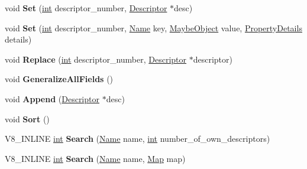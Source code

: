 \begin{DoxyCompactItemize}
void {\bfseries Set} (\mbox{\hyperlink{classint}{int}} descriptor\+\_\+number, \mbox{\hyperlink{classv8_1_1internal_1_1Descriptor}{Descriptor}} $\ast$desc)
\item 
\mbox{\label{classv8_1_1internal_1_1DescriptorArray_a01c9b4a85ea0c8445676617dde9ecb64}} 
void {\bfseries Set} (\mbox{\hyperlink{classint}{int}} descriptor\+\_\+number, \mbox{\hyperlink{classv8_1_1internal_1_1Name}{Name}} key, \mbox{\hyperlink{classv8_1_1internal_1_1MaybeObject}{Maybe\+Object}} value, \mbox{\hyperlink{classv8_1_1internal_1_1PropertyDetails}{Property\+Details}} details)
\item 
\mbox{\label{classv8_1_1internal_1_1DescriptorArray_a077c7152dd11617df87f9b272b70a97c}} 
void {\bfseries Replace} (\mbox{\hyperlink{classint}{int}} descriptor\+\_\+number, \mbox{\hyperlink{classv8_1_1internal_1_1Descriptor}{Descriptor}} $\ast$descriptor)
\item 
\mbox{\label{classv8_1_1internal_1_1DescriptorArray_a00191f46229918edfd69d60b605d98b4}} 
void {\bfseries Generalize\+All\+Fields} ()
\item 
\mbox{\label{classv8_1_1internal_1_1DescriptorArray_aca6d89b775bf9bf687ba9a654521eb49}} 
void {\bfseries Append} (\mbox{\hyperlink{classv8_1_1internal_1_1Descriptor}{Descriptor}} $\ast$desc)
\item 
\mbox{\label{classv8_1_1internal_1_1DescriptorArray_a5ef83bcfde45529ee36e444ed17e4dde}} 
void {\bfseries Sort} ()
\item 
\mbox{\label{classv8_1_1internal_1_1DescriptorArray_afccbff8e3acb85faece7774b8c099198}} 
V8\+\_\+\+I\+N\+L\+I\+NE \mbox{\hyperlink{classint}{int}} {\bfseries Search} (\mbox{\hyperlink{classv8_1_1internal_1_1Name}{Name}} name, \mbox{\hyperlink{classint}{int}} number\+\_\+of\+\_\+own\+\_\+descriptors)
\item 
\mbox{\label{classv8_1_1internal_1_1DescriptorArray_a9142803a100141ad29a6c301a0434a21}} 
V8\+\_\+\+I\+N\+L\+I\+NE \mbox{\hyperlink{classint}{int}} {\bfseries Search} (\mbox{\hyperlink{classv8_1_1internal_1_1Name}{Name}} name, \mbox{\hyperlink{classv8_1_1internal_1_1Map}{Map}} map)

\end{DoxyCompactItemize}
